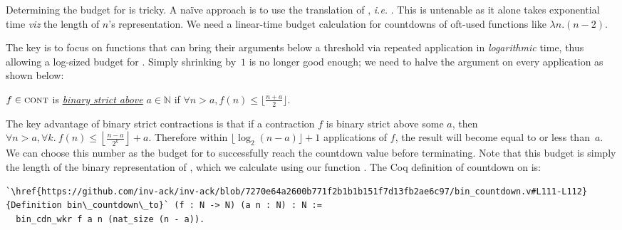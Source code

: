 Determining the budget for  is tricky.
A naïve approach is to use the  translation of ,
\emph{i.e.} . This is untenable as it alone
takes exponential time \emph{viz} the length of $n$'s representation.
We need a linear-time budget calculation for countdowns
of oft-used functions like $\lambda n.(n-2)$.

The key is to focus on functions that can bring their arguments below a threshold via repeated application in
\emph{logarithmic} time, thus allowing a log-sized budget for
. Simply shrinking by~$1$ is no longer good enough;
we need to halve the argument on every application as shown below:
\begin{defn} \label{defn: bin-contraction}
	$f\in \text{\scshape{cont}}$ is
	\href{https://github.com/inv-ack/inv-ack/blob/7270e64a2600b771f2b1b1b151f7d13fb2ae6c97/bin_countdown.v#L37-L41}{\emph{binary strict above}}
	$a\in \mathbb{N}$ if $\forall n > a, f(n) \le \lfloor \frac{n + a}{2} \rfloor$.
\end{defn}
The key advantage of binary strict contractions is that if a contraction $f$ is binary strict above some $a$, then
$\forall n > a, \forall k.~f(n) \le \left\lfloor \frac{n - a}{2^k} \right\rfloor + a$.
Therefore within $\lfloor \log_2 (n - a) \rfloor + 1$ applications of $f$, the result will become equal to or less than~$a$. We can choose this number as the budget for  to successfully reach the countdown value before terminating.
Note that this budget is simply the length of the binary representation
of , which we calculate using our function
\href{https://github.com/inv-ack/inv-ack/blob/7270e64a2600b771f2b1b1b151f7d13fb2ae6c97/bin_prelims.v#L135-L143}{}. %
The Coq definition of countdown on  is:
\begin{lstlisting}
`\href{https://github.com/inv-ack/inv-ack/blob/7270e64a2600b771f2b1b1b151f7d13fb2ae6c97/bin_countdown.v#L111-L112}{Definition bin\_countdown\_to}` (f : N -> N) (a n : N) : N :=
  bin_cdn_wkr f a n (nat_size (n - a)).
\end{lstlisting}

